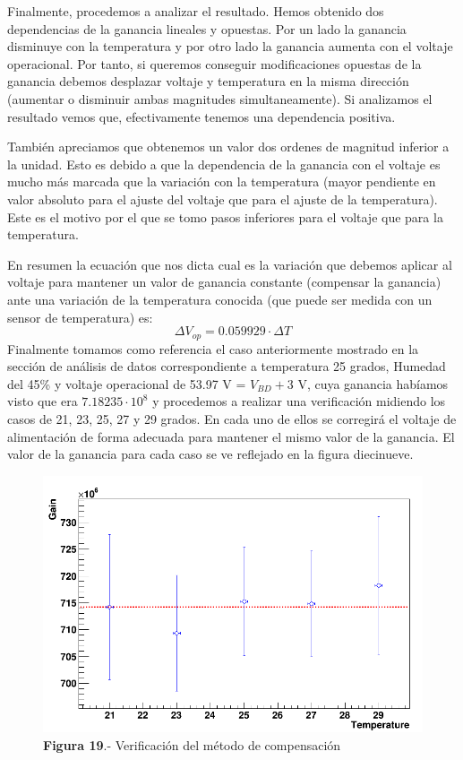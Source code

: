 Finalmente, procedemos a analizar el resultado. Hemos obtenido dos dependencias de la ganancia lineales y opuestas. Por un lado la ganancia disminuye con la temperatura y por otro lado la ganancia aumenta con el voltaje operacional. Por tanto, si queremos conseguir modificaciones opuestas de la ganancia debemos desplazar voltaje y temperatura en la misma dirección (aumentar o disminuir ambas magnitudes simultaneamente). Si analizamos el resultado vemos que, efectivamente tenemos una dependencia positiva.

También apreciamos que obtenemos un valor dos ordenes de magnitud inferior a la unidad. Esto es debido a que la dependencia de la ganancia con el voltaje es mucho más marcada que la variación con la temperatura (mayor pendiente en valor absoluto para el ajuste del voltaje que para el ajuste de la temperatura). Este es el motivo por el que se tomo pasos inferiores para el voltaje que para la temperatura. 

En resumen la ecuación que nos dicta cual es la variación que debemos aplicar al voltaje para mantener un valor de ganancia constante (compensar la ganancia) ante una variación de la temperatura conocida (que puede ser medida con un sensor de temperatura) es:
\begin{equation}
\Delta V_{op}=0.059929 \cdot \Delta T
\label{compensacionfinal}
\end{equation}
Finalmente tomamos como referencia el caso anteriormente mostrado en la sección de análisis de datos correspondiente a temperatura 25 grados, Humedad del 45\% y voltaje operacional de 53.97 V = $V_{BD}+ 3$ V, cuya ganancia habíamos visto que era $7.18235 \cdot 10^8$ y procedemos a realizar una verificación midiendo los casos de 21, 23, 25, 27 y 29 grados. En cada uno de ellos se corregirá el voltaje de alimentación de forma adecuada para mantener el mismo valor de la ganancia. El valor de la ganancia para cada caso se ve reflejado en la figura diecinueve. 

\begin{figure}[hbtp]
\centering
\includegraphics[scale=0.4]{compensacion.png}
\caption{\textbf{Figura 19}.- Verificación del método de compensación}
\end{figure}

